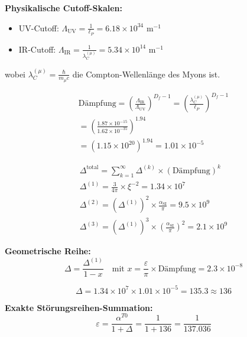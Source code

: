 \documentclass[12pt,a4paper]{article}
\numberwithin{equation}{section}
\newcommand{\xipar}{\xi}
\newcommand{\epsilonT}{\varepsilon}
\newcommand{\alphaSI}{\alpha_{\text{SI}}}
\newcommand{\alphaT}{\alpha^{T0}}
\newcommand{\Df}{D_f}
\newcommand{\lP}{\ell_P}
\newcommand{\lambdaC}{\lambda_C}
\begin{document}
	\textbf{Physikalische Cutoff-Skalen:}
	\begin{itemize}
		\item UV-Cutoff: $\Lambda_{\text{UV}} = \frac{1}{\lP} = 6.18 \times 10^{34}$ m$^{-1}$
		\item IR-Cutoff: $\Lambda_{\text{IR}} = \frac{1}{\lambdaC^{(\mu)}} = 5.34 \times 10^{14}$ m$^{-1}$
	\end{itemize}
	
	wobei $\lambdaC^{(\mu)} = \frac{\hbar}{m_\mu c}$ die Compton-Wellenlänge des Myons ist.
	
	\begin{align}
		\text{Dämpfung} = \left(\frac{\Lambda_{\text{IR}}}{\Lambda_{\text{UV}}}\right)^{\Df-1} = \left(\frac{\lambdaC^{(\mu)}}{\lP}\right)^{\Df-1}\\
		= \left(\frac{1.87 \times 10^{-15}}{1.62 \times 10^{-35}}\right)^{1.94}\\
		= \left(1.15 \times 10^{20}\right)^{1.94} = 1.01 \times 10^{-5}
		\label{eq:damping_factor}
	\end{align}
	
	\begin{align}
		\Delta^{\text{total}} = \sum_{k=1}^{\infty} \Delta^{(k)} \times (\text{Dämpfung})^k\\
		\Delta^{(1)} = \frac{3}{4\pi} \times \xipar^{-2} = 1.34 \times 10^7\\
		\Delta^{(2)} = (\Delta^{(1)})^2 \times \frac{\alphaSI}{\pi} = 9.5 \times 10^{9}\\
		\Delta^{(3)} = (\Delta^{(1)})^3 \times \left(\frac{\alphaSI}{\pi}\right)^2 = 2.1 \times 10^{9}
		\label{eq:perturbation_series}
	\end{align}
	
	\textbf{Geometrische Reihe:}
	\begin{equation}
		\Delta = \frac{\Delta^{(1)}}{1-x} \quad \text{mit } x = \frac{ \epsilonT}{\pi} \times \text{Dämpfung} = 2.3 \times 10^{-8}
		\label{eq:geometric_series}
	\end{equation}
	
	\begin{equation}
		\Delta = 1.34 \times 10^7 \times 1.01 \times 10^{-5} = 135.3 \approx 136
		\label{eq:delta_final}
	\end{equation}
	
	\textbf{Exakte Störungsreihen-Summation:}
	\begin{equation}
		\epsilonT = \frac{\alphaT}{1+\Delta} = \frac{1}{1+136} = \frac{1}{137.036}
		\label{eq:epsilon_renormalized}
	\end{equation}
	
\end{document}
